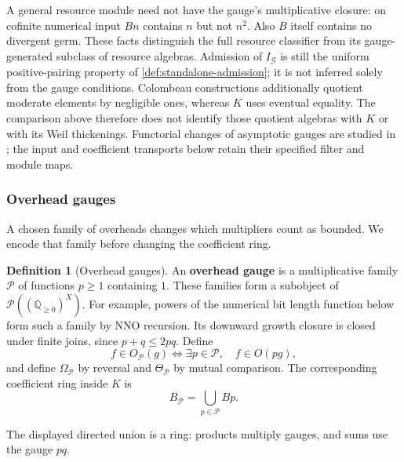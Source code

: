 \documentclass[11pt,a4paper]{article}
\numberwithin{algorithm}{section}
\numberwithin{equation}{section}
\theoremstyle{definition}
\newtheorem{definition}[definition]{Definition}
\theoremstyle{remark}
\theoremstyle{plain}
\newcommand{\QQ}{\mathbb Q}
\newcommand{\Pow}{\mathcal P}
\newcommand{\Qplus}{{\QQ_{\ge0}}}
\theoremstyle{definition}
\theoremstyle{plain}
\begin{document}
A general resource module need not have the gauge's multiplicative
closure: on cofinite numerical input $Bn$ contains $n$ but not
$n^2$. Also $B$ itself contains no divergent germ. These facts
distinguish the full resource classifier from its gauge-generated
subclass of resource algebras. Admission of $I_{\mathcal G}$ is still the uniform
positive-pairing property of \cref{def:standalone-admission};
it is not inferred solely from the gauge conditions.
Colombeau constructions additionally quotient moderate elements
by negligible ones, whereas $K$ uses eventual equality.
The comparison above therefore does not identify those quotient
algebras with $K$ or with its Weil thickenings.
Functorial changes of asymptotic gauges are studied in
\citep{LuperiBagliniGiordano2017CategoryColombeau}; the input and
coefficient transports below retain their specified filter and
module maps.


\subsubsection{Overhead gauges}
A chosen family of overheads changes which multipliers count as
bounded. We encode that family before changing the coefficient ring.


\begin{definition}[Overhead gauges]\label{def:overhead-gauges}
An \textbf{overhead gauge} is a multiplicative family $\mathcal P$ of functions $p\ge1$ containing
$1$. These families form a subobject of $\Pow((\Qplus)^X)$.
For example, powers of the numerical bit length function below form
such a family by NNO recursion. Its downward growth closure is
closed under finite joins, since $p+q\le2pq$. Define
\[
 f\in O_{\mathcal P}(g)\iff
 \exists p\in\mathcal P,\quad f\in O(pg),
\]
and define $\Omega_{\mathcal P}$ by reversal and
$\Theta_{\mathcal P}$ by mutual comparison.
The corresponding coefficient ring inside $K$ is
\[
 B_{\mathcal P}=\bigcup_{p\in\mathcal P}Bp.
\]
\end{definition}


The displayed directed union is a ring: products multiply
gauges, and sums use the gauge $pq$.
\end{document}
